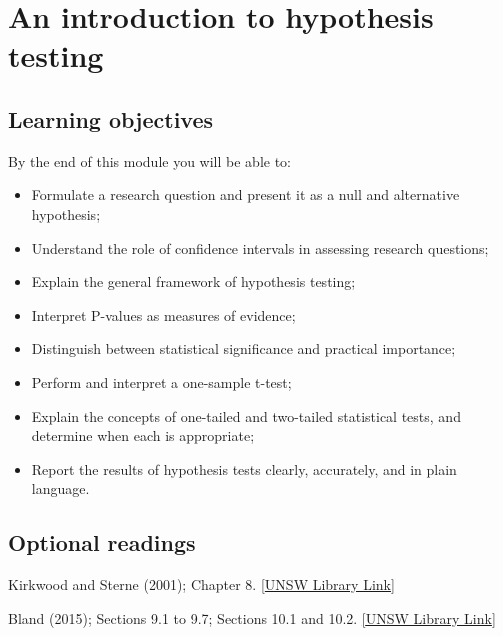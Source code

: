 \documentclass[
  a4paper,
]{memoir}
\providecommand{\tightlist}{%
  \setlength{\itemsep}{0pt}\setlength{\parskip}{0pt}}
\begin{document}

\chapter{An introduction to hypothesis
testing}\label{an-introduction-to-hypothesis-testing}

\section*{Learning objectives}\label{learning-objectives-3}


By the end of this module you will be able to:

\begin{itemize}
\tightlist
\item
  Formulate a research question and present it as a null and alternative
  hypothesis;
\item
  Understand the role of confidence intervals in assessing research
  questions;
\item
  Explain the general framework of hypothesis testing;
\item
  Interpret P-values as measures of evidence;
\item
  Distinguish between statistical significance and practical importance;
\item
  Perform and interpret a one-sample t-test;
\item
  Explain the concepts of one-tailed and two-tailed statistical tests,
  and determine when each is appropriate;
\item
  Report the results of hypothesis tests clearly, accurately, and in
  plain language.
\end{itemize}

\section*{Optional readings}\label{optional-readings-3}


Kirkwood and Sterne (2001); Chapter 8.
\href{http://er1.library.unsw.edu.au/er/cgi-bin/eraccess.cgi?url=https://ebookcentral.proquest.com/lib/unsw/detail.action?docID=624728}{{[}UNSW
Library Link{]}}

Bland (2015); Sections 9.1 to 9.7; Sections 10.1 and 10.2.
\href{http://er1.library.unsw.edu.au/er/cgi-bin/eraccess.cgi?url=https://ebookcentral.proquest.com/lib/unsw/detail.action?docID=5891730}{{[}UNSW
Library Link{]}}
\end{document}
